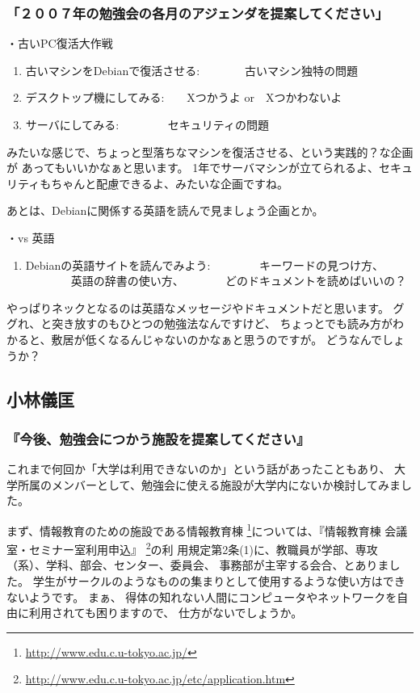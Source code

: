 \documentclass[mingoth,a4paper,twoside]{jsarticle}
\begin{document}
\subsubsection{「２００７年の勉強会の各月のアジェンダを提案してください」}

・古いPC復活大作戦
\begin{enumerate}
 \item 古いマシンをDebianで復活させる:　　　　古いマシン独特の問題
 \item デスクトップ機にしてみる:　　Xつかうよ or　Xつかわないよ
 \item サーバにしてみる:  　　　　セキュリティの問題
\end{enumerate}
みたいな感じで、ちょっと型落ちなマシンを復活させる、という実践的？な企画が
あってもいいかなぁと思います。
1年でサーバマシンが立てられるよ、セキュリティもちゃんと配慮できるよ、みたいな企画ですね。

あとは、Debianに関係する英語を読んで見ましょう企画とか。

・vs 英語
\begin{enumerate}
 \item Debianの英語サイトを読んでみよう:
 　　　　キーワードの見つけ方、
 　　　　英語の辞書の使い方、
 　　　 どのドキュメントを読めばいいの？
\end{enumerate}
やっぱりネックとなるのは英語なメッセージやドキュメントだと思います。
ググれ、と突き放すのもひとつの勉強法なんですけど、
ちょっとでも読み方がわかると、敷居が低くなるんじゃないのかなぁと思うのですが。
どうなんでしょうか？

\subsection{小林儀匡}

\subsubsection{『今後、勉強会につかう施設を提案してください』}
これまで何回か「大学は利用できないのか」という話があったこともあり、
大学所属のメンバーとして、勉強会に使える施設が大学内にないか検討してみました。

まず、情報教育のための施設である情報教育棟
\footnote{\url{http://www.edu.c.u-tokyo.ac.jp/}}については、『情報教育棟 
会議室・セミナー室利用申込』
\footnote{\url{http://www.edu.c.u-tokyo.ac.jp/etc/application.htm}}の利
用規定第2条(1)に、教職員が学部、専攻（系）、学科、部会、センター、委員会、
事務部が主宰する会合、とありました。
学生がサークルのようなものの集まりとして使用するような使い方はできないようです。
まぁ、
得体の知れない人間にコンピュータやネットワークを自由に利用されても困りますので、
仕方がないでしょうか。
\end{document}
